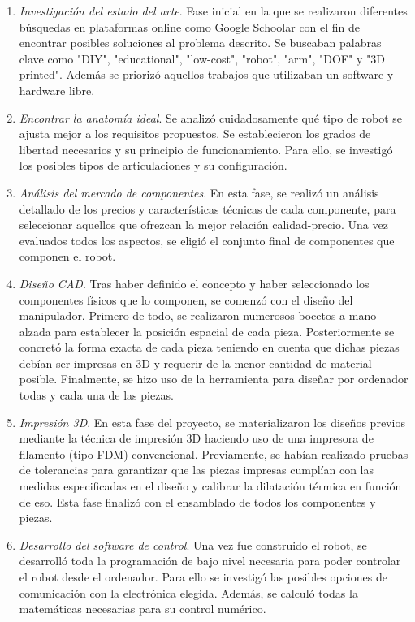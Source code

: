 \begin{enumerate}
\item \textit{Investigación del estado del arte}. Fase inicial en la que se realizaron diferentes
búsquedas en plataformas online como Google Schoolar con el fin de encontrar posibles soluciones al problema descrito. Se buscaban 
palabras clave como "DIY", "educational", "low-cost", "robot", "arm", "DOF" y "3D printed". Además se priorizó aquellos trabajos que utilizaban un 
software y hardware libre. 
\item \textit{Encontrar la anatomía ideal}. Se analizó cuidadosamente qué tipo de robot se ajusta mejor a los requisitos propuestos. Se establecieron los 
grados de libertad necesarios y su principio de funcionamiento. Para ello, se investigó los posibles tipos de articulaciones y 
su configuración.

\item \textit{Análisis del mercado de componentes}. En esta fase, se realizó un análisis detallado de los precios y características 
técnicas de cada componente, para seleccionar aquellos que ofrezcan la mejor relación calidad-precio. Una vez evaluados todos los 
aspectos, se eligió el conjunto final de componentes que componen el robot.

\item \textit{Diseño CAD}. Tras haber definido el concepto y haber seleccionado los componentes físicos que lo componen, se comenzó con 
el diseño del manipulador. Primero de todo, se realizaron numerosos bocetos a mano alzada para establecer la posición espacial de cada 
pieza. Posteriormente se concretó la forma exacta de cada pieza teniendo en cuenta que dichas piezas debían ser impresas en 3D y requerir 
de la menor cantidad de material posible. Finalmente, se hizo uso de la herramienta  para diseñar por ordenador 
todas y cada una de las piezas.

\item \textit{Impresión 3D}. En esta fase del proyecto, se materializaron los diseños previos mediante la técnica de impresión 3D haciendo 
uso de una impresora de filamento (tipo \acs{FDM}) convencional. Previamente, se habían realizado pruebas de tolerancias para garantizar 
que las piezas impresas cumplían con las medidas especificadas en el diseño y calibrar la dilatación térmica en función de eso. Esta fase 
finalizó con el ensamblado de todos los componentes y piezas.

\item \textit{Desarrollo del software de control}. Una vez fue construido el robot, se desarrolló toda la programación de bajo nivel 
necesaria para poder controlar el robot desde el ordenador. Para ello se investigó las posibles opciones de comunicación con la electrónica elegida. Además,  
se calculó todas la matemáticas necesarias para su control numérico.


\end{enumerate}
